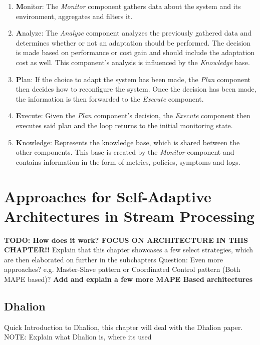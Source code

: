     \begin{enumerate}
    \label{enum:mape}
        \item \textbf{M}onitor: 
            The \textit{Monitor} component gathers data about the system and its environment, aggregates and filters it.
        \item \textbf{A}nalyze: 
            The \textit{Analyze} component analyzes the previously gathered data and determines whether or not an adaptation should be performed.
            The decision is made based on performance or cost gain and should include the adaptation cost as well.
            This component's analysis is influenced by the \textit{Knowledge} base.
        \item \textbf{P}lan: 
            If the choice to adapt the system has been made, the \textit{Plan} component then decides how to reconfigure the system.
            Once the decision has been made, the information is then forwarded to the \textit{Execute} component.
        \item \textbf{E}xecute: 
            Given the \textit{Plan} component's decision, the \textit{Execute} component then executes said plan and the loop 
            returns to the initial monitoring state.
        \item \textbf{K}nowledge: 
            Represents the knowledge base, which is shared between the other components.
            This base is created by the \textit{Monitor} component and contains information in the form of metrics, policies, symptoms and logs.
    \end{enumerate}
   


\chapter{Approaches for Self-Adaptive Architectures in Stream Processing}
\label{cha:approaches}
\textbf{TODO: How does it work? FOCUS ON ARCHITECTURE IN THIS CHAPTER!!}
Explain that this chapter showcases a few select strategies, which are then elaborated on further in the subchapters
Question: Even more approaches? e.g. Master-Slave pattern or Coordinated Control pattern (Both MAPE based)?
\textbf{Add and explain a few more MAPE Based architectures}

    \section{Dhalion}
    \label{sec:dhalion}
    Quick Introduction to Dhalion, this chapter will deal with the Dhalion paper.
    NOTE: Explain what Dhalion is, where its used

